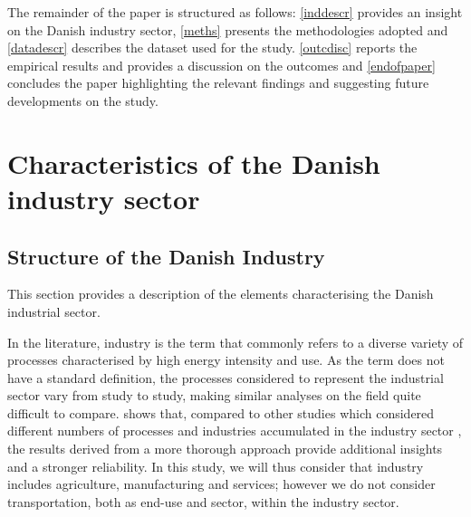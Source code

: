\documentclass[review]{elsarticle}
\begin{document}
The remainder of the paper is structured as follows: \autoref{inddescr} provides an insight on the Danish industry sector, \autoref{meths} presents the methodologies adopted and \autoref{datadescr} describes the dataset used for the study. \autoref{outcdisc} reports the empirical results and provides a discussion on the outcomes and \autoref{endofpaper} concludes the paper highlighting the relevant findings and suggesting future developments on the study.

\section{Characteristics of the Danish industry sector} \label{inddescr}

\subsection{Structure of the Danish Industry}
This section provides a description of the elements characterising the Danish industrial sector.

In the literature, industry is the term that commonly refers to a diverse variety of processes characterised by high energy intensity and use. As the term does not have a standard definition, the processes considered to represent the industrial sector vary from study to study, making similar analyses on the field quite difficult to compare.
\cite{Buhler2016} shows that, compared to other studies which considered different numbers of processes and industries accumulated in the industry sector \cite{Oladiran2007,Al-Ghandoor2010,Dincer2003,Sanaei2012}, the results derived from a more thorough approach provide additional insights and a stronger reliability. In this study, we will thus consider that industry includes agriculture, manufacturing and services; however we do not consider transportation, both as end-use and sector, within the industry sector.
\end{document}
